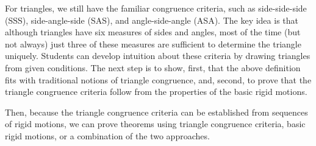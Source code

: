 For triangles, we still have the familiar congruence criteria, such as side-side-side (SSS), side-angle-side (SAS), and angle-side-angle (ASA).  The key idea is that although triangles have six measures of sides and angles, most of the time (but not always) just three of these measures are sufficient to determine the triangle uniquely.  Students can develop intuition about these criteria by drawing triangles from given conditions.  The next step is to show, first, that the above definition fits with traditional notions of triangle congruence, and, second, to prove that the triangle congruence criteria follow from the properties of the basic rigid motions.

Then, because the triangle congruence criteria can be established from sequences of rigid motions, we can prove theorems using triangle congruence criteria, basic rigid motions, or a combination of the two approaches.  



